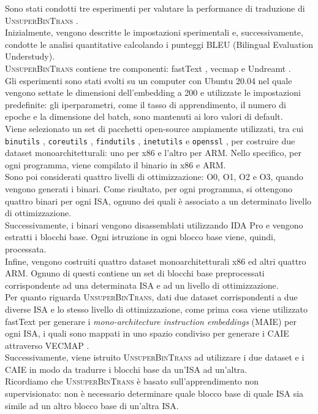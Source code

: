 \documentclass[12pt,a4paper,openright,twoside]{report}
\begin{document}
Sono stati condotti tre esperimenti per valutare la performance di traduzione di \textsc{UnsuperBinTrans} . \\Inizialmente, vengono descritte le impostazioni sperimentali e, successivamente, condotte le analisi quantitative calcolando i punteggi BLEU (Bilingual Evaluation Understudy).\\
\textsc{UnsuperBinTrans} contiene tre componenti: fastText \cite{fastText}, vecmap \cite{vecmap} e Undreamt \cite{Undreamt}.\\
Gli esperimenti sono stati svolti su un computer con Ubuntu 20.04 nel quale vengono settate le dimensioni dell'embedding a 200 e utilizzate le impostazioni predefinite: gli iperparametri, come il tasso di apprendimento, il numero di epoche  e la dimensione del batch, sono mantenuti ai loro valori di default.\\
Viene selezionato un set di pacchetti open-source ampiamente utilizzati, tra cui \texttt{binutils} \cite{binutils}, \texttt{coreutils} \cite{coreutils}, \texttt{findutils} \cite{findutils}, \texttt{inetutils} \cite{inetutils} e \texttt{openssl} \cite{openssl}, per costruire due dataset monoarchitetturali: uno per x86 e l'altro per ARM. Nello specifico, per ogni programma, viene compilato il binario in x86 e ARM.\\ Sono poi considerati quattro livelli di ottimizzazione: O0, O1, O2 e O3, quando vengono generati i binari. Come risultato, per ogni programma, si ottengono quattro binari per ogni ISA, ognuno dei quali è associato a un determinato livello di ottimizzazione.\\
Successivamente, i binari vengono disassemblati utilizzando IDA Pro \cite{idapro} e vengono estratti i blocchi base. Ogni istruzione in ogni blocco base viene, quindi, processata. \\Infine, vengono costruiti quattro dataset monoarchitetturali x86 ed altri quattro ARM. Ognuno di questi contiene un set di blocchi base preprocessati corrispondente ad una determinata ISA e ad un livello di ottimizzazione.\\
Per quanto riguarda \textsc{UnsuperBinTrans}, dati due dataset corrispondenti a due diverse ISA e lo stesso livello di ottimizzazione, come prima cosa viene utilizzato fastText per generare i \textit{mono-architecture instruction embeddings} (MAIE) per ogni ISA, i quali sono mappati in uno spazio condiviso per generare i CAIE attraverso VECMAP \cite{vecmap}.\\
Successivamente, viene istruito \textsc{UnsuperBinTrans} ad utilizzare i due dataset e i CAIE in modo da tradurre i blocchi base da un'ISA ad un'altra. \\Ricordiamo che \textsc{UnsuperBinTrans} è basato sull'apprendimento non supervisionato: non è necessario determinare quale blocco base di quale ISA sia simile ad un altro blocco base di un'altra ISA.\\
\end{document}
